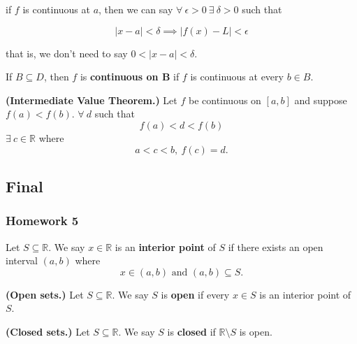 \begin{remark} if \(f\) is continuous at \(a\), then we can say \(\forall \ \epsilon > 0 \ \exists \ \delta > 0 \) such that

\[
|x - a| < \delta \implies |f(x) - L| < \epsilon
\]

that is, we don't need to say \(0 < |x - a| < \delta\).

\end{remark}

\begin{definition} If \(B \subseteq D\), then \(f\) is \textbf{continuous on B} if \(f\) is continuous at every \(b \in B\).

\end{definition}

\begin{theorem} \textbf{(Intermediate Value Theorem.)} Let \(f\) be continuous on \([a, b]\) and suppose \(f(a) < f(b)\). \(\forall \ d\) such that \[f(a) < d < f(b)\]  \(\exists \ c \in \mathbb{R}\) where \[a < c < b, \ f(c) = d.\]

\end{theorem}

\pagebreak

\subsection{Final}

\subsubsection{Homework 5}

\begin{definition} Let \(S \subseteq \mathbb{R}\). We say \(x \in \mathbb{R}\) is an \textbf{interior point} of \(S\) if there exists an open interval \((a, b)\) where \[x \in (a, b) \text{ and } (a, b) \subseteq S.\]

\end{definition}

\begin{definition} \textbf{(Open sets.)} Let \(S \subseteq \mathbb{R}\). We say \(S\) is \textbf{open} if every \(x \in S\) is an interior point of \(S\).

\end{definition}

\begin{definition} \textbf{(Closed sets.)} Let \(S \subseteq \mathbb{R}\). We say \(S\) is \textbf{closed} if \(\mathbb{R} \setminus S\) is open.

\end{definition}

